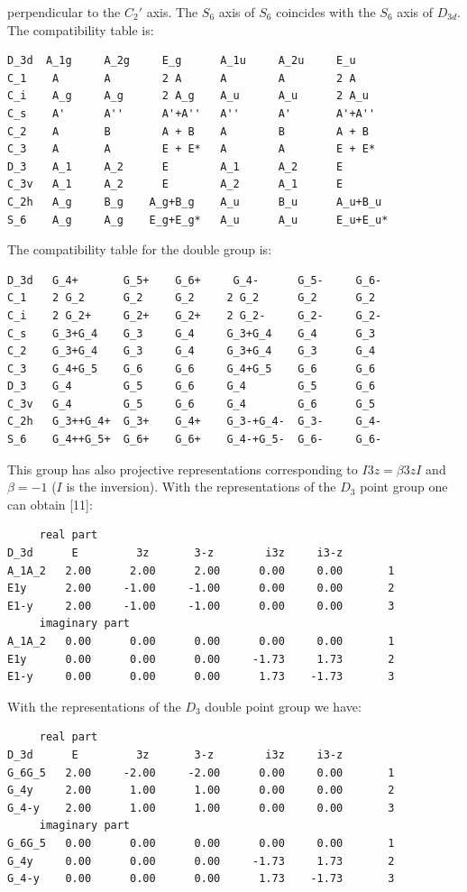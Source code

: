 \documentclass[12pt,a4paper]{article}
\begin{document}
perpendicular to the $C_2'$ axis. The $S_6$ axis of $S_6$ coincides with the
$S_6$ axis of $D_{3d}$. \\
The compatibility table is:
\begin{verbatim}
D_3d  A_1g     A_2g     E_g      A_1u     A_2u     E_u
C_1    A       A        2 A      A        A        2 A
C_i    A_g     A_g      2 A_g    A_u      A_u      2 A_u
C_s    A'      A''      A'+A''   A''      A'       A'+A''
C_2    A       B        A + B    A        B        A + B
C_3    A       A        E + E*   A        A        E + E*
D_3    A_1     A_2      E        A_1      A_2      E
C_3v   A_1     A_2      E        A_2      A_1      E
C_2h   A_g     B_g    A_g+B_g    A_u      B_u      A_u+B_u   
S_6    A_g     A_g    E_g+E_g*   A_u      A_u      E_u+E_u*
\end{verbatim}
The compatibility table for the double group is:
\begin{verbatim}
D_3d   G_4+       G_5+    G_6+     G_4-      G_5-     G_6-
C_1    2 G_2      G_2     G_2     2 G_2      G_2      G_2      
C_i    2 G_2+     G_2+    G_2+    2 G_2-     G_2-     G_2-
C_s    G_3+G_4    G_3     G_4     G_3+G_4    G_4      G_3
C_2    G_3+G_4    G_3     G_4     G_3+G_4    G_3      G_4    
C_3    G_4+G_5    G_6     G_6     G_4+G_5    G_6      G_6
D_3    G_4        G_5     G_6     G_4        G_5      G_6
C_3v   G_4        G_5     G_6     G_4        G_6      G_5
C_2h   G_3++G_4+  G_3+    G_4+    G_3-+G_4-  G_3-     G_4-
S_6    G_4++G_5+  G_6+    G_6+    G_4-+G_5-  G_6-     G_6-
\end{verbatim}
This group has also projective representations corresponding to
$I {3z} = \beta {3z} I$ and $\beta=-1$ ($I$ is the inversion).
With the representations of the $D_3$ point group one can obtain [11]:
\begin{verbatim}
     real part
D_3d      E         3z       3-z        i3z     i3-z
A_1A_2   2.00      2.00      2.00      0.00     0.00       1
E1y      2.00     -1.00     -1.00      0.00     0.00       2
E1-y     2.00     -1.00     -1.00      0.00     0.00       3
     imaginary part
A_1A_2   0.00      0.00      0.00      0.00     0.00       1
E1y      0.00      0.00      0.00     -1.73     1.73       2
E1-y     0.00      0.00      0.00      1.73    -1.73       3
\end{verbatim}
With the representations of the $D_3$ double point group we have:
\begin{verbatim}
     real part
D_3d      E         3z       3-z        i3z     i3-z
G_6G_5   2.00     -2.00     -2.00      0.00     0.00       1
G_4y     2.00      1.00      1.00      0.00     0.00       2
G_4-y    2.00      1.00      1.00      0.00     0.00       3
     imaginary part
G_6G_5   0.00      0.00      0.00      0.00     0.00       1
G_4y     0.00      0.00      0.00     -1.73     1.73       2
G_4-y    0.00      0.00      0.00      1.73    -1.73       3
\end{verbatim}
\end{document}
